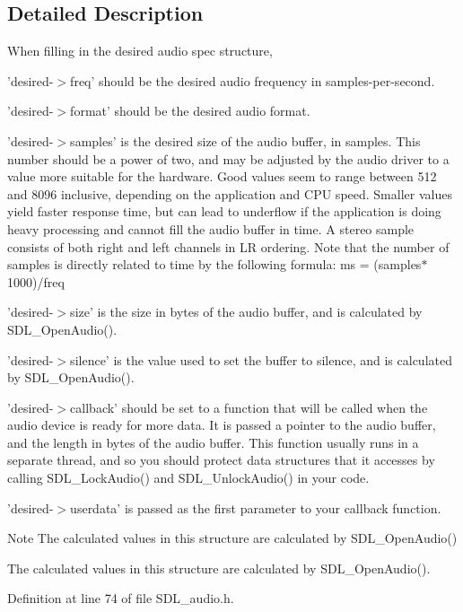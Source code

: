 \subsection{Detailed Description}
When filling in the desired audio spec structure,
\begin{DoxyItemize}
\item 'desired-\/$>$freq' should be the desired audio frequency in samples-\/per-\/second.
\item 'desired-\/$>$format' should be the desired audio format.
\item 'desired-\/$>$samples' is the desired size of the audio buffer, in samples. This number should be a power of two, and may be adjusted by the audio driver to a value more suitable for the hardware. Good values seem to range between 512 and 8096 inclusive, depending on the application and C\+P\+U speed. Smaller values yield faster response time, but can lead to underflow if the application is doing heavy processing and cannot fill the audio buffer in time. A stereo sample consists of both right and left channels in L\+R ordering. Note that the number of samples is directly related to time by the following formula\+: ms = (samples$\ast$1000)/freq
\item 'desired-\/$>$size' is the size in bytes of the audio buffer, and is calculated by S\+D\+L\+\_\+\+Open\+Audio().
\item 'desired-\/$>$silence' is the value used to set the buffer to silence, and is calculated by S\+D\+L\+\_\+\+Open\+Audio().
\item 'desired-\/$>$callback' should be set to a function that will be called when the audio device is ready for more data. It is passed a pointer to the audio buffer, and the length in bytes of the audio buffer. This function usually runs in a separate thread, and so you should protect data structures that it accesses by calling S\+D\+L\+\_\+\+Lock\+Audio() and S\+D\+L\+\_\+\+Unlock\+Audio() in your code.
\item 'desired-\/$>$userdata' is passed as the first parameter to your callback function.
\end{DoxyItemize}

\begin{DoxyNote}{Note}
The calculated values in this structure are calculated by S\+D\+L\+\_\+\+Open\+Audio()
\end{DoxyNote}
The calculated values in this structure are calculated by S\+D\+L\+\_\+\+Open\+Audio(). 

Definition at line 74 of file S\+D\+L\+\_\+audio.\+h.




